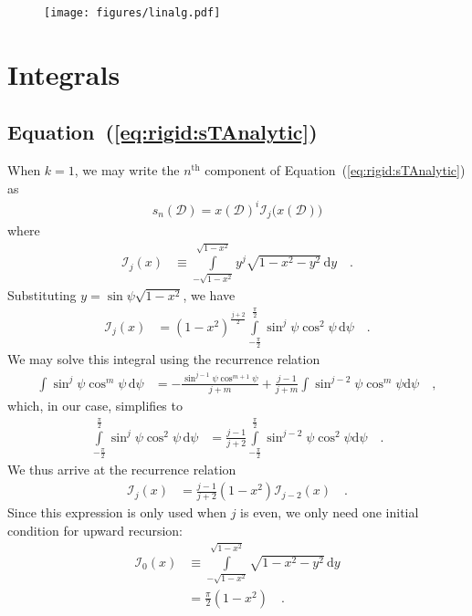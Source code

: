 \documentclass[modern]{aastex62}
\begin{document}
\begin{figure}[p!]
    \begin{centering}
    \texttt{[image: figures/linalg.pdf]}
    \end{centering}
\end{figure}


%
%
%
%
\appendix
%
%
%
%

\section{Integrals}
\subsection{Equation~(\ref{eq:rigid:sTAnalytic})}
%
When $k = 1$, we may write the $n^\mathrm{th}$ component
of Equation~(\ref{eq:rigid:sTAnalytic}) as
%
\begin{align}
    s_n(\mathcal{D}) = 
        x(\mathcal{D})^{i}
        \mathcal{I}_{j}\big(x(\mathcal{D})\big)
\end{align}
%
where
%
\begin{align}
    \mathcal{I}_j(x) &\equiv
    \int\limits_{-\sqrt{1-x^2}}^{\sqrt{1-x^2}}
        y^{j}
        \sqrt{1 - x^2 - y^2} \,
    \mathrm{d}y
    \quad.
\end{align}
%
Substituting $y = \sin\psi\sqrt{1 - x^2}$, we have
%
\begin{align}
    \mathcal{I}_j(x) &=
    (1 - x^2)^{\frac{j + 2}{2}}
    \int\limits_{-\frac{\pi}{2}}^{\frac{\pi}{2}}
        \sin^j\psi
        \cos^2\psi \,
    \mathrm{d}\psi
    \quad.
\end{align}
%
We may solve this integral using the recurrence relation
%
\begin{align}
    \int
        \sin^j\psi
        \cos^m\psi \,
    \mathrm{d}\psi
    &=
    -\frac{\sin^{j-1}\psi \cos^{m+1}\psi}{j + m}
    +
    \frac{j - 1}{j + m}\int\sin^{j-2}\psi \cos^m\psi \mathrm{d}\psi
    \quad ,
\end{align}
%
which, in our case, simplifies to
%
\begin{align}
    \int\limits_{-\frac{\pi}{2}}^{\frac{\pi}{2}}
        \sin^j\psi
        \cos^2\psi \,
    \mathrm{d}\psi
    &=
    \frac{j - 1}{j + 2}\int\limits_{-\frac{\pi}{2}}^
        {\frac{\pi}{2}}\sin^{j-2}\psi \cos^2\psi \mathrm{d}\psi
    \quad.
\end{align}
%
We thus arrive at the recurrence relation
%
\begin{align}
    \label{eq:app:Ij}
    \mathcal{I}_j(x) &=
    \frac{j - 1}{j + 2}
    (1 - x^2)
    \mathcal{I}_{j-2}(x)
    \quad.
\end{align}
%
Since this expression is only used when $j$ is even, we only need one
initial condition for upward recursion:
%
\begin{align}
    \label{eq:app:I0}
    \mathcal{I}_0(x) &\equiv
    \int\limits_{-\sqrt{1-x^2}}^{\sqrt{1-x^2}}
        \sqrt{1 - x^2 - y^2} \,
    \mathrm{d}y
    \nonumber \\
    &= \frac{\pi}{2}(1 - x^2)
    \quad.
\end{align}


\end{document}

